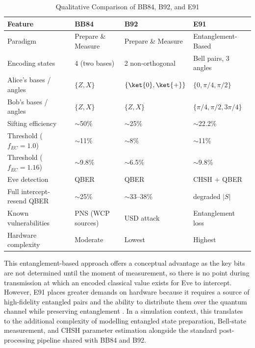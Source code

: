 \begin{table}[h]
\centering
\caption{Qualitative Comparison of BB84, B92, and E91}
\label{tab:protocol-comparison}
\footnotesize
\begin{tabularx}{\linewidth}{@{}l X X X@{}}
\toprule
\textbf{Feature} & \textbf{BB84} & \textbf{B92} & \textbf{E91} \\
\midrule
Paradigm & Prepare \& Measure & Prepare \& Measure & Entanglement-Based \\
Encoding states & 4 (two bases) & 2 non-orthogonal & Bell pairs, 3 angles \\
Alice's bases / angles & $\{Z, X\}$ & $\{\ket{0}, \ket{+}\}$ & $\{0, \pi/4, \pi/2\}$ \\
Bob's bases / angles & $\{Z, X\}$ & $\{Z, X\}$ & $\{\pi/4, \pi/2, 3\pi/4\}$ \\
Sifting efficiency & $\sim$50\% & $\sim$25\% & $\sim$22.2\% \\
Threshold ($f_{EC}\!=\!1.0$) & $\sim$11\% & $\sim$8\% & $\sim$11\% \\
Threshold ($f_{EC}\!=\!1.16$) & $\sim$9.8\% & $\sim$6.5\% & $\sim$9.8\% \\
Eve detection & QBER & QBER & CHSH $+$ QBER \\
Full intercept-resend QBER & $\sim$25\% & $\sim$33--38\% & degraded $|S|$ \\
Known vulnerabilities & PNS (WCP sources) & USD attack & Entanglement loss \\
Hardware complexity & Moderate & Lowest & Highest \\
\bottomrule
\end{tabularx}
\end{table}

This entanglement-based approach offers a conceptual advantage as the key bits are not determined until the moment of measurement, so there is no point during transmission at which an encoded classical value exists for Eve to intercept. However, E91 places greater demands on hardware because it requires a source of high-fidelity entangled pairs and the ability to distribute them over the quantum channel while preserving entanglement \cite{ekertQI}. In a simulation context, this translates to the additional complexity of modelling entangled state preparation, Bell-state measurement, and CHSH parameter estimation alongside the standard post-processing pipeline shared with BB84 and B92.





